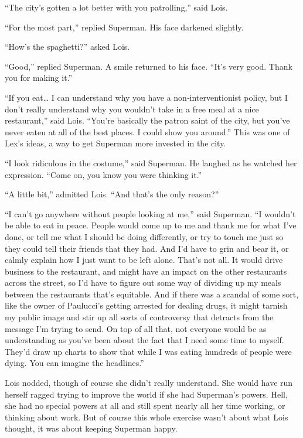 \documentclass[ebook,12pt]{memoir}
\begin{document}
``The city's gotten a lot better with you patrolling,'' said Lois.

``For the most part,'' replied Superman. His face darkened slightly.

``How's the spaghetti?'' asked Lois.

``Good,'' replied Superman. A smile returned to his face. ``It's very
good. Thank you for making it.''

``If you eat\ldots{} I can understand why you have a non‐interventionist
policy, but I don't really understand why you wouldn't take in a free
meal at a nice restaurant,'' said Lois. ``You're basically the patron
saint of the city, but you've never eaten at all of the best places. I
could show you around.'' This was one of Lex's ideas, a way to get
Superman more invested in the city.

``I look ridiculous in the costume,'' said Superman. He laughed as he
watched her expression. ``Come on, you know you were thinking it.''

``A little bit,'' admitted Lois. ``And that's the only reason?''

``I can't go anywhere without people looking at me,'' said Superman. ``I
wouldn't be able to eat in peace. People would come up to me and thank
me for what I've done, or tell me what I should be doing differently, or
try to touch me just so they could tell their friends that they had. And
I'd have to grin and bear it, or calmly explain how I just want to be
left alone. That's not all. It would drive business to the restaurant,
and might have an impact on the other restaurants across the street, so
I'd have to figure out some way of dividing up my meals between the
restaurants that's equitable. And if there was a scandal of some sort,
like the owner of Paulucci's getting arrested for dealing drugs, it
might tarnish my public image and stir up all sorts of controversy that
detracts from the message I'm trying to send. On top of all that, not
everyone would be as understanding as you've been about the fact that I
need some time to myself. They'd draw up charts to show that while I was
eating hundreds of people were dying. You can imagine the headlines.''

Lois nodded, though of course she didn't really understand. She would
have run herself ragged trying to improve the world if she had
Superman's powers. Hell, she had no special powers at all and still
spent nearly all her time working, or thinking about work. But of course
this whole exercise wasn't about what Lois thought, it was about keeping
Superman happy.
\end{document}
